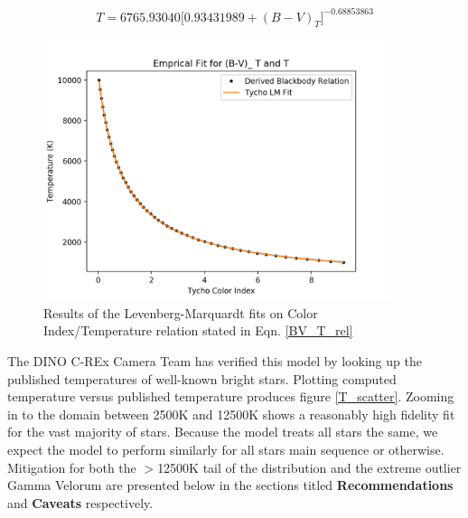 \documentclass[]{DINOReportMemo}
\begin{document}
\begin{equation}\label{empirical_T_func}
    T = 6765.93040\Big[0.93431989+(B-V)_T\Big]^{-0.68853863}
\end{equation}
\begin{figure}[t!]
    \centering
    \includegraphics[height=3in]{tycho_lm_fit}
    \caption{Results of the Levenberg-Marquardt fits on Color Index/Temperature relation stated in Eqn. \ref{BV_T_rel}}
\end{figure}

The DINO C-REx Camera Team has verified this model by looking up the published temperatures of well-known bright stars. Plotting computed temperature versus published temperature produces figure \ref{T_scatter}. Zooming in to the domain between 2500K and 12500K shows a reasonably high fidelity fit for the vast majority of stars. Because the model treats all stars the same, we expect the model to perform similarly for all stars main sequence or otherwise. Mitigation for both the $>$12500K tail of the distribution and the extreme outlier Gamma Velorum are presented below in the sections titled  \textbf{Recommendations} and \textbf{Caveats} respectively.
\end{document}
